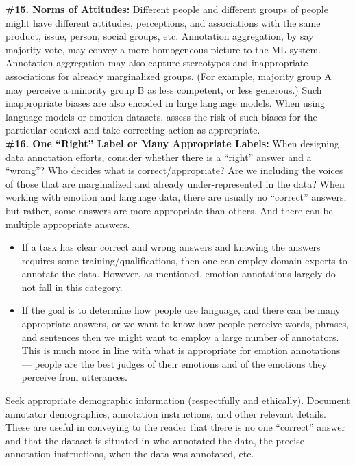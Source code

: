 \documentclass{clv3}
\begin{document}
\noindent \textbf{\#15. Norms of Attitudes:} Different people and different groups of people might have different attitudes, perceptions, and associations with the same product, issue, person, social groups, etc. Annotation aggregation, by say majority vote, may convey a more homogeneous picture to the ML system. Annotation aggregation may also capture stereotypes and inappropriate associations for already marginalized groups. (For example, majority group A may perceive a minority group B as less competent, or less generous.) Such inappropriate biases are also encoded in large language models. When using language models or emotion datasets, assess the risk of such biases for the particular context and take correcting action as appropriate.\\

\noindent \textbf{\#16. One “Right” Label or Many Appropriate Labels:} When designing data annotation efforts, consider whether there is a “right” answer and a “wrong”? Who decides what is correct/appropriate? Are we including the voices of those that are marginalized and already under-represented in the data? %
When working with emotion and language data, there are usually no ``correct'' answers, but rather, some answers are more appropriate than others. And there can be multiple appropriate answers.\\[-20pt]
\begin{itemize}
\item If a task has clear correct and wrong answers and knowing the answers requires some training/qualifications, then one can employ domain experts to annotate the data. However, as mentioned, emotion annotations largely do not fall in this category.
\item If the goal is to determine how people use language, and there can be many appropriate answers, or we want to know how people perceive words, phrases, and sentences then we might want to employ a large number of annotators. This is much more in line with what is appropriate for emotion annotations — people are the best judges of their emotions and of the emotions they perceive from utterances.\\[-20pt]
\end{itemize}
\vspace*{-3mm}
\noindent Seek appropriate demographic information (respectfully and ethically).  Document annotator demographics, annotation instructions, and other relevant details. These are useful
in conveying to the reader that there is no one ``correct'' answer and that the dataset is situated in who annotated the data, the precise annotation instructions, when the data was annotated, etc.\\
\end{document}
